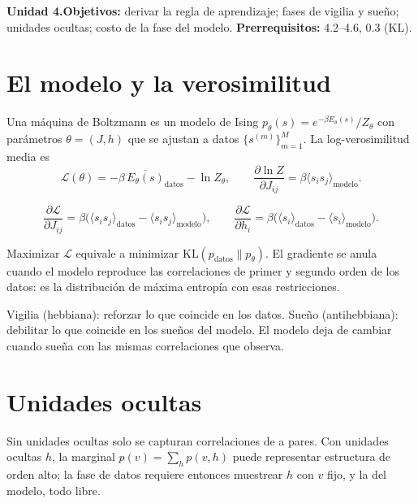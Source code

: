\documentclass[11pt,a4paper]{article}
\begin{document}

\noindent\textbf{Unidad 4.}\quad\textbf{Objetivos:} derivar la regla de aprendizaje; fases de vigilia y sueño; unidades ocultas; costo de la fase del modelo.
\textbf{Prerrequisitos:} 4.2--4.6, 0.3 (KL).

\section{El modelo y la verosimilitud}
Una máquina de Boltzmann \cite{ackley} es un modelo de Ising $p_\theta(s)=e^{-\beta E_\theta(s)}/Z_\theta$ con parámetros $\theta=(J,h)$ que se ajustan a
datos $\{s^{(m)}\}_{m=1}^M$. La log-verosimilitud media es
\begin{equation}
\mathcal L(\theta)=-\beta\,\overline{E_\theta(s)}_{\text{datos}}-\ln Z_\theta,\qquad
\frac{\partial\ln Z}{\partial J_{ij}}=\beta\langle s_is_j\rangle_{\text{modelo}} .
\end{equation}
\begin{resultado}
\begin{equation}
\frac{\partial\mathcal L}{\partial J_{ij}}=\beta\big(\langle s_is_j\rangle_{\text{datos}}-\langle s_is_j\rangle_{\text{modelo}}\big),\qquad
\frac{\partial\mathcal L}{\partial h_i}=\beta\big(\langle s_i\rangle_{\text{datos}}-\langle s_i\rangle_{\text{modelo}}\big).
\end{equation}
\end{resultado}
\noindent Maximizar $\mathcal L$ equivale a minimizar $\mathrm{KL}(p_{\text{datos}}\|p_\theta)$. El gradiente se anula cuando el modelo reproduce las correlaciones
de primer y segundo orden de los datos: es la distribución de máxima entropía con esas restricciones.

\begin{intuicion}
Vigilia (hebbiana): reforzar lo que coincide en los datos. Sueño (antihebbiana): debilitar lo que coincide en los sueños del modelo. El modelo
deja de cambiar cuando sueña con las mismas correlaciones que observa.
\end{intuicion}

\section{Unidades ocultas}
Sin unidades ocultas solo se capturan correlaciones de a pares. Con unidades ocultas $h$, la marginal $p(v)=\sum_hp(v,h)$ puede representar
estructura de orden alto; la fase de datos requiere entonces muestrear $h$ con $v$ fijo, y la del modelo, todo libre.
\end{document}
